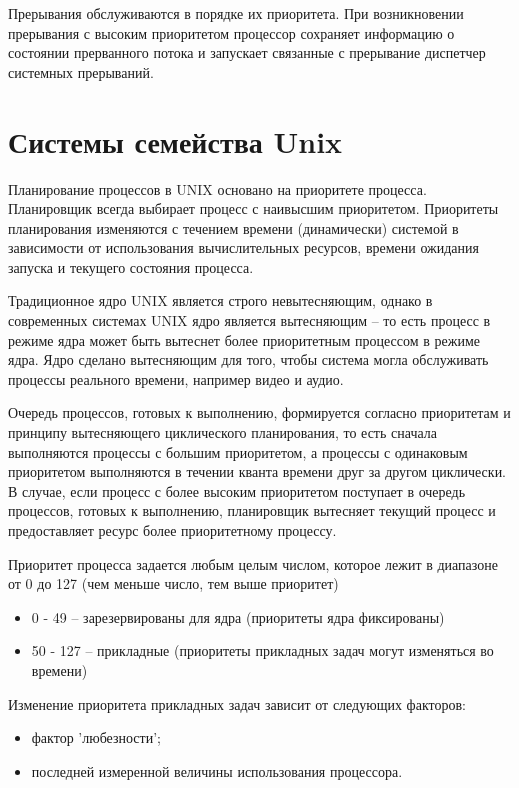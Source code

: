 Прерывания обслуживаются в порядке их приоритета. При возникновении прерывания с высоким приоритетом процессор сохраняет информацию о состоянии прерванного потока и запускает связанные с прерывание диспетчер системных прерываний.

\clearpage


\section{Системы семейства Unix}

Планирование процессов в UNIX основано на приоритете процесса. Планировщик всегда выбирает процесс с наивысшим приоритетом. Приоритеты планирования изменяются с течением времени (динамически) системой в зависимости от использования вычислительных ресурсов, времени ожидания запуска и текущего состояния процесса.

Традиционное ядро UNIX является строго невытесняющим, однако в современных системах UNIX ядро является вытесняющим -- то есть процесс в режиме ядра может быть вытеснет более приоритетным процессом в режиме ядра. Ядро сделано вытесняющим для того, чтобы система могла обслуживать процессы реального времени, например видео и аудио.

Очередь процессов, готовых к выполнению, формируется согласно приоритетам и принципу вытесняющего циклического планирования, то есть сначала выполняются процессы с большим приоритетом, а процессы с одинаковым приоритетом выполняются в течении кванта времени друг за другом циклически. В случае, если процесс с более высоким приоритетом поступает в очередь процессов, готовых к выполнению, планировщик вытесняет текущий процесс и предоставляет ресурс более приоритетному процессу.

Приоритет процесса задается любым целым числом, которое лежит в диапазоне от 0 до 127 (чем меньше число, тем выше приоритет)
\begin{itemize}
	\item 0 - 49 -- зарезервированы для ядра (приоритеты ядра фиксированы)
	\item 50 - 127 -- прикладные  (приоритеты прикладных задач могут изменяться во времени)
\end{itemize}

Изменение приоритета прикладных задач зависит от следующих факторов:
\begin{itemize}
	\item фактор 'любезности';
	\item последней измеренной величины использования процессора.
\end{itemize}

